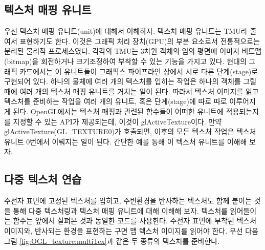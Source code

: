 \subsection{텍스처 매핑 유니트}

우선 텍스처 매핑 유니트(unit)에 대해서 이해하자. 텍스처 매핑 유니트는 TMU라 줄여서 표현하기도 한다. 이것은 그래픽 처리 장치(GPU)의 부분 요소로서 전통적으로는 분리된 물리적 프로세스였다. 각각의 TMU는 3차원 객체의 임의 평면에 이미지 비트맵(bitmap)을 회전하거나 크기조정하여 부착할 수 있는 기능을 가지고 있다. 현대의 그래픽 카드에서는 이 유니트들이 그래픽스 파이프라인 상에서 서로 다른 단계(stage)로 구현되어 있다. 하나의 물체에 여러 개의 텍스처를 입히는 작업은 하나의 객체를 그릴 때에 여러 개의 텍스처 매핑 유니트를 거치는 일이 된다. 따라서 텍스처 이미지를 읽고 텍스처를 준비하는 작업을 여러 개의 유니트, 혹은 단계(stage)에 따로 따로 이루어지게 된다.
OpenGL에서는 텍스처 매핑과 관련된 함수들이 어떠한 유니트에 적용되는지를 지정할 수 있는 API가 제공되는데, 이것이 {\sf glActiveTexture}이다. 만약 {\sf glActiveTexture(GL\_TEXTURE0)}가 호출되면, 이후의 모든 텍스처 작업은 텍스처 유니트 0번에서 이뤄지는 일이 된다. 간단한 예를 통해 이 텍스처 유니트를 이해해 보자.


\subsection{다중 텍스처 연습}

주전자 표면에 고정된 텍스처를 입히고, 주변환경을 반사하는 텍스처도 함께 붙이는 것을 통해 다중 텍스처링과 텍스처 매핑 유니트에 대해 이해해 보자.
텍스처를 읽어들이는 함수는 앞에서 살펴본 것과 동일한 코드를 사용한다. 주전자 표면에 부착된 텍스처 이미지와, 반사되는 환경을 표현하는 구면 맵 텍스처 이미지를 읽어야 한다. 
우선 다음 그림 \ref{fig:OGL_texture:multiTex}과 같은 두 종류의 텍스처를 준비한다.

